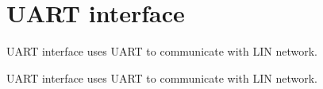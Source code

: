 \hypertarget{group___u_a_r_t__group}{}\section{U\+A\+R\+T interface}
\label{group___u_a_r_t__group}


U\+A\+R\+T interface uses U\+A\+R\+T to communicate with L\+I\+N network.  


U\+A\+R\+T interface uses U\+A\+R\+T to communicate with L\+I\+N network. 

